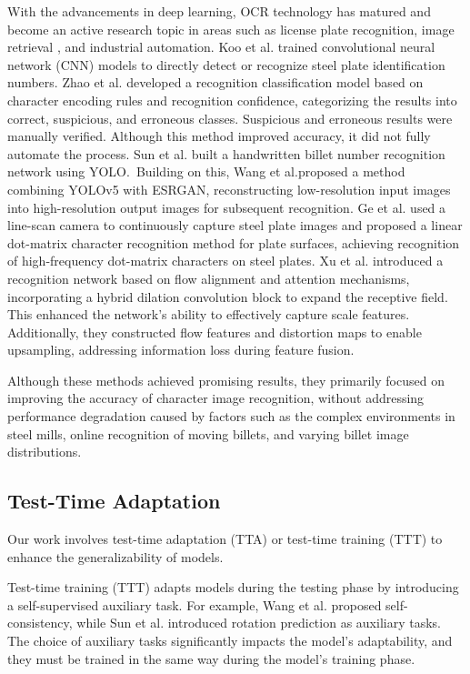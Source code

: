 With the advancements in deep learning, OCR technology has matured and become an active research topic in areas such as license plate recognition, image retrieval \cite{7}, and industrial automation. Koo et al.\cite{8} trained convolutional neural network (CNN) models to directly detect or recognize steel plate identification numbers. Zhao et al.\cite{9} developed a recognition classification model based on character encoding rules and recognition confidence, categorizing the results into correct, suspicious, and erroneous classes. Suspicious and erroneous results were manually verified. Although this method improved accuracy, it did not fully automate the process. Sun et al.\cite{10} built a handwritten billet number recognition network using YOLO.\  Building on this, Wang et al.\cite{11}proposed a method combining YOLOv5 with ESRGAN, reconstructing low-resolution input images into high-resolution output images for subsequent recognition. Ge et al.\cite{12} used a line-scan camera to continuously capture steel plate images and proposed a linear dot-matrix character recognition method for plate surfaces, achieving recognition of high-frequency dot-matrix characters on steel plates. Xu et al.\cite{13} introduced a recognition network based on flow alignment and attention mechanisms, incorporating a hybrid dilation convolution block to expand the receptive field. This enhanced the network's ability to effectively capture scale features. Additionally, they constructed flow features and distortion maps to enable upsampling, addressing information loss during feature fusion.

Although these methods achieved promising results, they primarily focused on improving the accuracy of character image recognition, without addressing performance degradation caused by factors such as the complex environments in steel mills, online recognition of moving billets, and varying billet image distributions.

 



\subsection{Test-Time Adaptation}

Our work involves test-time adaptation (TTA) or test-time training (TTT) to enhance the generalizability of models.

Test-time training (TTT) adapts models during the testing phase by introducing a self-supervised auxiliary task. For example, Wang et al.\cite{14} proposed self-consistency, while Sun et al.\cite{15} introduced rotation prediction as auxiliary tasks. The choice of auxiliary tasks significantly impacts the model's adaptability, and they must be trained in the same way during the model’s training phase.

